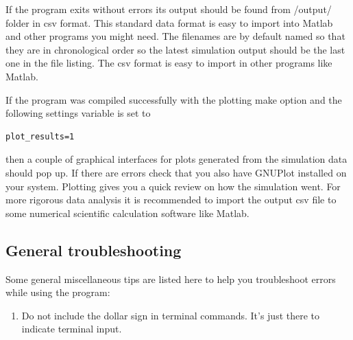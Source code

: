 \documentclass[english,12pt,a4paper,pdftex,sci,utf8]{aaltothesis}
\begin{document}
If the program exits without errors its output should be found from /output/ folder in csv format. This standard data format is easy to import into Matlab and other programs you might need. The filenames are by default named so that they are in chronological order so the latest simulation output should be the last one in the file listing. The csv format is easy to import in other programs like Matlab.
\par If the program was compiled successfully with the plotting make option and the following settings variable is set to
\begin{verbatim}
plot_results=1 
\end{verbatim}
then a couple of graphical interfaces for plots generated from the simulation data should pop up. If there are errors check that you also have GNUPlot installed on your system. Plotting gives you a quick review on how the simulation went. For more rigorous data analysis it is recommended to import the output csv file to some numerical scientific calculation software like Matlab.

\subsection{General troubleshooting}
Some general miscellaneous tips are listed here to help you troubleshoot errors while using the program:
\begin{enumerate}
\item Do not include the dollar sign in terminal commands. It's just there to indicate terminal input.
\end{enumerate}
\end{document}

